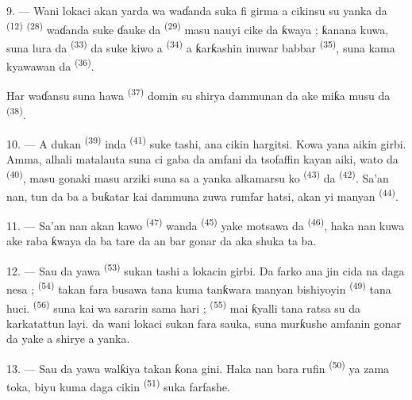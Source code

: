 9. --- Wani lokaci akan yarda wa waɗanda suka fi girma a cikinsu su
yanka da  \textsuperscript{(12)}  \textsuperscript{(28)} waɗanda suke ɗauke da 
\textsuperscript{(29)} masu nauyi cike da ƙwaya ; ƙanana kuwa, suna
lura da  \textsuperscript{(33)} da suke kiwo a
 \textsuperscript{(34)} a ƙarƙashin inuwar babbar
 \textsuperscript{(35)}, suna kama kyawawan
 da  \textsuperscript{(36)}.

Har waɗansu suna hawa  \textsuperscript{(37)} domin su
shirya dammunan da ake miƙa musu da 
\textsuperscript{(38)}.

10. --- A dukan  \textsuperscript{(39)} inda
 \textsuperscript{(41)} suke tashi, ana cikin
hargitsi. Kowa yana aikin girbi. Amma, alhali matalauta suna ci gaba
da amfani da tsofaffin kayan aiki, wato 
da  \textsuperscript{(40)}, masu gonaki masu
arziki suna sa a yanka alkamarsu ko 
\textsuperscript{(43)} da  \textsuperscript{(42)}.
Sa’an nan, tun da ba a buƙatar kai dammuna zuwa rumfar hatsi, akan yi
manyan  \textsuperscript{(44)}.

11. --- Sa’an nan akan kawo 
\textsuperscript{(47)} wanda  \textsuperscript{(45)}
yake motsawa da  \textsuperscript{(46)}, haka nan
kuwa ake raba ƙwaya da  ba tare da an bar gonar da
aka shuka ta ba.

\VUsaut{5.0mm}
\VUsaut{3.4mm}

12. --- Sau da yawa  \textsuperscript{(53)} sukan
tashi a lokacin girbi. Da farko ana jin cida na  daga
nesa ;  \textsuperscript{(54)} takan fara busawa
tana kuma tanƙwara manyan bishiyoyin 
\textsuperscript{(49)} tana huci. 
\textsuperscript{(56)} suna kai wa sararin sama hari ; 
\textsuperscript{(55)} mai ƙyalli tana ratsa su da karkatattun layi.
 da wani lokaci  sukan fara sauka,
suna murƙushe amfanin gonar da yake a shirye a yanka.

13. --- Sau da yawa walƙiya takan ƙona gini. Haka nan bara rufin
 \textsuperscript{(50)} ya zama toka, biyu
kuma daga cikin  \textsuperscript{(51)} suka
farfashe.

